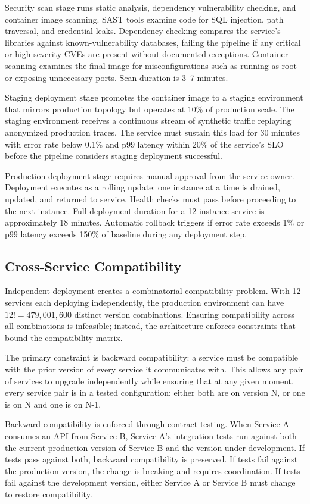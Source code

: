 Security scan stage runs static analysis, dependency vulnerability checking, and container image scanning. SAST tools examine code for SQL injection, path traversal, and credential leaks. Dependency checking compares the service's libraries against known-vulnerability databases, failing the pipeline if any critical or high-severity CVEs are present without documented exceptions. Container scanning examines the final image for misconfigurations such as running as root or exposing unnecessary ports. Scan duration is 3--7 minutes.

Staging deployment stage promotes the container image to a staging environment that mirrors production topology but operates at 10\% of production scale. The staging environment receives a continuous stream of synthetic traffic replaying anonymized production traces. The service must sustain this load for 30 minutes with error rate below 0.1\% and p99 latency within 20\% of the service's SLO before the pipeline considers staging deployment successful.

Production deployment stage requires manual approval from the service owner. Deployment executes as a rolling update: one instance at a time is drained, updated, and returned to service. Health checks must pass before proceeding to the next instance. Full deployment duration for a 12-instance service is approximately 18 minutes. Automatic rollback triggers if error rate exceeds 1\% or p99 latency exceeds 150\% of baseline during any deployment step.

\subsection{Cross-Service Compatibility}

Independent deployment creates a combinatorial compatibility problem. With 12 services each deploying independently, the production environment can have $12! = 479,001,600$ distinct version combinations. Ensuring compatibility across all combinations is infeasible; instead, the architecture enforces constraints that bound the compatibility matrix.

The primary constraint is backward compatibility: a service must be compatible with the prior version of every service it communicates with. This allows any pair of services to upgrade independently while ensuring that at any given moment, every service pair is in a tested configuration: either both are on version N, or one is on N and one is on N-1.

Backward compatibility is enforced through contract testing. When Service A consumes an API from Service B, Service A's integration tests run against both the current production version of Service B and the version under development. If tests pass against both, backward compatibility is preserved. If tests fail against the production version, the change is breaking and requires coordination. If tests fail against the development version, either Service A or Service B must change to restore compatibility.

